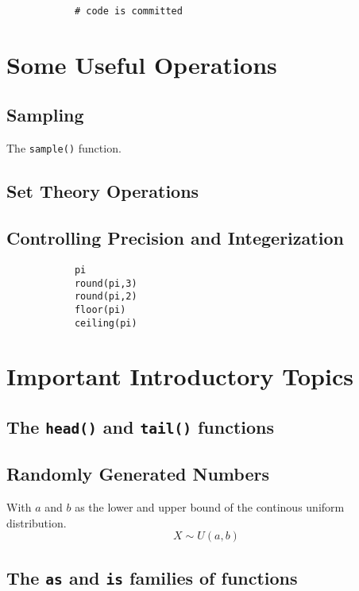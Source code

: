 \documentclass[a4paper,12pt]{article}
\begin{document}
\begin{itemize}
\begin{itemize}
\begin{framed}
\begin{verbatim}
			# code is committed
			\end{verbatim}
		\end{framed}
		
		
		
		
		\section{Some Useful Operations}
		\subsection{Sampling}
		
		The \texttt{sample()} function.
		
		\subsection{Set Theory Operations}
		
		\subsection{Controlling Precision and Integerization}
		\begin{framed}
			\begin{verbatim}
			pi
			round(pi,3)
			round(pi,2)
			floor(pi)
			ceiling(pi)
			\end{verbatim}
		\end{framed}
		
		
		\section{Important Introductory Topics}
		\subsection{The \texttt{head()} and \texttt{tail()} functions}
		\subsection{Randomly Generated Numbers}
		With $a$ and $b$ as the lower and upper bound of the continous uniform distribution.
		\[X \sim U(a,b)\]
		\subsection{The \texttt{as} and \texttt{is} families of functions}

\end{itemize}
\end{itemize}
\end{document}

